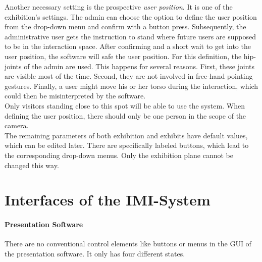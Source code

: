 Another necessary setting is the prospective \textit{user position}. It is one of the exhibition's settings. The admin can choose the option to define the user position from the drop-down menu and confirm with a button press. Subsequently, the administrative user gets the instruction to stand where future users are supposed to be in the interaction space. After confirming and a short wait to get into the user position, the software will safe the user position. For this definition, the hip-joints of the admin are used. This happens for several reasons. First, these joints are visible most of the time. Second, they are not involved in free-hand pointing gestures. Finally, a user might move his or her torso during the interaction, which could then be misinterpreted by the software. 
\\
Only visitors standing close to this spot will be able to use the system. When defining the user position, there should only be one person in the scope of the camera.
\\
The remaining parameters of both exhibition and exhibits have default values, which can be edited later. There are specifically labeled buttons, which lead to the corresponding drop-down menus. Only the exhibition plane cannot be changed this way.


\section{Interfaces of the \ac{IMI}-System} 

\paragraph{Presentation Software} There are no conventional control elements like buttons or menus in the \ac{GUI} of the presentation software. It only has four different states.

